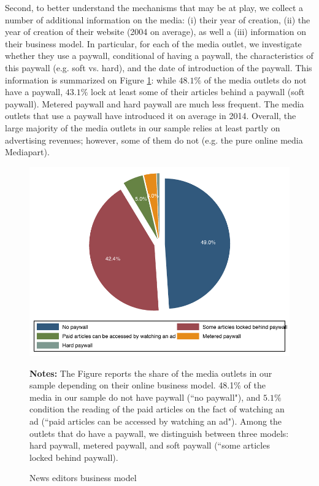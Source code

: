 Second, to better understand the mechanisms that may be at play, we collect a number of additional information on the media: (i) their year of creation, (ii) the year of creation of their website (2004 on average), as well a (iii) information on their business model. In particular, for each of the media outlet, we investigate whether they use a paywall, conditional of having a paywall, the characteristics of this paywall (e.g. soft vs. hard), and the date of introduction of the paywall. This information is summarized on Figure \ref{fig:paywall_final}: while $48.1\%$ of the media outlets do not have a paywall, $43.1\%$ lock at least some of their articles behind a paywall (soft paywall). Metered paywall and hard paywall are much less frequent. The media outlets that use a paywall have introduced it on average in 2014. Overall, the large majority of the media outlets in our sample relies at least partly on advertising revenues; however, some of them do not (e.g. the pure online media Mediapart).


\begin{figure}
\begin{center}
\includegraphics[scale=1]{figures/paywall_final}
\end{center}
	\begin{spacing}{0.5}
		{\footnotesize \textbf{Notes:} The Figure reports the share of the media outlets in our sample depending on their online business model. 48.1\% of the media in our sample do not have paywall (``no paywall"), and $5.1\%$ condition the reading of the paid articles on the fact of watching an ad (``paid articles can be accessed by watching an ad"). Among the outlets that do have a paywall, we distinguish between three models: hard paywall, metered paywall, and soft paywall (``some articles locked behind paywall).}
	\end{spacing}
\vspace{.5cm}	
	\caption{News editors business model}
	\label{fig:paywall_final}
\end{figure}


